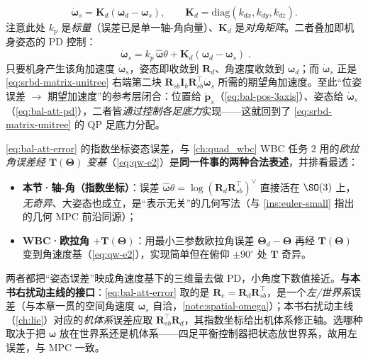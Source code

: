 \begin{equation}
  \dot{\boldsymbol{\omega}}_s=\mathbf{K}_d(\boldsymbol{\omega}_d-\boldsymbol{\omega}_s),
  \qquad
  \mathbf{K}_d=\mathrm{diag}(k_{dx},k_{dy},k_{dz}).
  \label{eq:bal-att-d}
\end{equation}
注意此处 $k_p$ 是\emph{标量}（误差已是单一轴-角向量）、$\mathbf{K}_d$ 是\emph{对角矩阵}。二者叠加即机身姿态的 PD 控制\cite{unitree2023quadruped}：
\begin{equation}
  \boxed{\;\dot{\boldsymbol{\omega}}_s=k_p\,\hat{\boldsymbol{\omega}}\theta+\mathbf{K}_d(\boldsymbol{\omega}_d-\boldsymbol{\omega}_s)\;}.
  \label{eq:bal-att-pd}
\end{equation}
只要机身产生该角加速度 $\dot{\boldsymbol{\omega}}_s$，姿态即收敛到 $\mathbf{R}_d$、角速度收敛到 $\boldsymbol{\omega}_d$；而 $\dot{\boldsymbol{\omega}}_s$ 正是 \cref{eq:srbd-matrix-unitree} 右端第二块 $\mathbf{R}_{sb}\mathbf{I}_b\mathbf{R}_{sb}^\top\dot{\boldsymbol{\omega}}_s$ 所需的期望角加速度。至此“位姿误差 $\to$ 期望加速度”的参考层闭合：位置给 $\ddot{\boldsymbol{p}}_s$（\cref{eq:bal-pos-3axis}）、姿态给 $\dot{\boldsymbol{\omega}}_s$（\cref{eq:bal-att-pd}），二者皆\emph{通过控制各足底力}实现——这就回到了 \cref{eq:srbd-matrix-unitree} 的 QP 足底力分配。

\begin{insight}\label{ins:bal-geometric-pd}
\cref{eq:bal-att-error} 的指数坐标姿态误差，与 \cref{ch:quad_wbc} WBC 任务 $2$ 用的\emph{欧拉角误差经 $\mathbf{T}(\boldsymbol{\Theta})$ 变基}（\cref{eq:qw-e2}）是\textbf{同一件事的两种合法表述}，并排看最透：
\begin{itemize}
  \item \textbf{本节·轴-角（指数坐标）}：误差 $\hat{\boldsymbol{\omega}}\theta=\log(\mathbf{R}_d\mathbf{R}_{sb}^\top)^\vee$ 直接活在 $\SO(3)$ 上，\emph{无奇异}、大姿态也成立，是“表示无关”的几何写法（与 \cref{ins:euler-small} 指出的几何 MPC 前沿同源）；
  \item \textbf{WBC·欧拉角 $+\mathbf{T}(\boldsymbol{\Theta})$}：用最小三参数欧拉角误差 $\boldsymbol{\Theta}_d-\boldsymbol{\Theta}$ 再经 $\mathbf{T}(\boldsymbol{\Theta})$ 变到角速度基（\cref{eq:qw-e2}），实现简单但在俯仰 $\pm90^\circ$ 处 $\mathbf{T}$ 奇异。
\end{itemize}
两者都把“姿态误差”映成角速度基下的三维量去做 PD，小角度下数值接近。\textbf{与本书右扰动主线的接口}：\cref{eq:bal-att-error} 取的是 $\mathbf{R}_e=\mathbf{R}_d\mathbf{R}_{sb}^\top$，是一个\emph{左/世界系}误差（与本章一贯的空间角速度 $\boldsymbol{\omega}_s$ 自洽，\cref{note:spatial-omega}）；本书右扰动主线（\cref{ch:lie}）对应的\emph{机体系}误差应取 $\mathbf{R}_{sb}^\top\mathbf{R}_d$，其指数坐标给出机体系修正轴。选哪种取决于把 $\boldsymbol{\omega}$ 放在世界系还是机体系——四足平衡控制器把状态放世界系，故用左误差，与 MPC 一致。
\end{insight}

